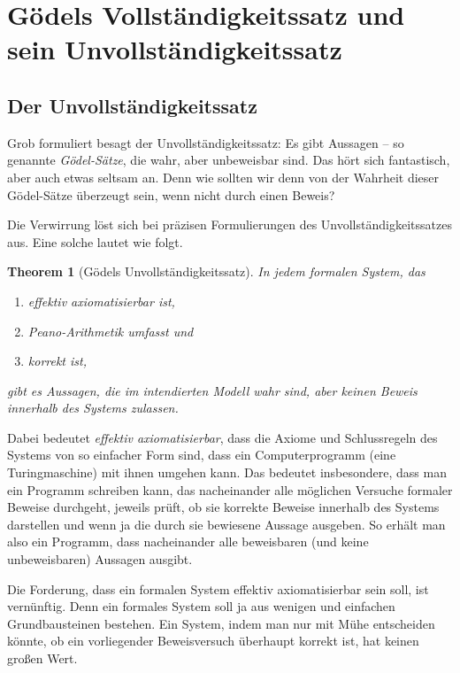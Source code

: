 \documentclass[twoside]{../zirkelblatt1415}
\theoremstyle{definition}
\theoremstyle{plain}
\newtheorem{thm}[defn]{Theorem}
\theoremstyle{remark}
\begin{document}
\section{Gödels Vollständigkeitssatz und sein Unvollständigkeitssatz}

\subsection{Der Unvollständigkeitssatz}

Grob formuliert besagt der Unvollständigkeitssatz: Es gibt Aussagen -- so
genannte \emph{Gödel-Sätze}, die wahr, aber unbeweisbar sind. Das hört sich
fantastisch, aber auch etwas seltsam an. Denn wie sollten wir denn von der
Wahrheit dieser Gödel-Sätze überzeugt sein, wenn nicht durch einen Beweis?

Die Verwirrung löst sich bei präzisen Formulierungen des
Unvollständigkeitssatzes aus. Eine solche lautet wie folgt.

\begin{thm}[Gödels Unvollständigkeitssatz]In jedem formalen System, das
\begin{enumerate}
\item effektiv axiomatisierbar ist,
\item Peano-Arithmetik umfasst und
\item korrekt ist,
\end{enumerate}
gibt es Aussagen, die im intendierten Modell wahr sind, aber keinen Beweis
innerhalb des Systems zulassen.
\end{thm}

Dabei bedeutet \emph{effektiv axiomatisierbar}, dass die Axiome und
Schlussregeln des Systems von so einfacher Form sind, dass ein Computerprogramm
(eine Turingmaschine) mit ihnen umgehen kann. Das bedeutet insbesondere, dass
man ein Programm schreiben kann, das nacheinander alle möglichen Versuche
formaler Beweise durchgeht, jeweils prüft, ob sie korrekte Beweise innerhalb des
Systems darstellen und wenn ja die durch sie bewiesene Aussage ausgeben. So
erhält man also ein Programm, dass nacheinander alle beweisbaren (und keine
unbeweisbaren) Aussagen ausgibt.

Die Forderung, dass ein formalen System effektiv axiomatisierbar sein soll, ist
vernünftig. Denn ein formales System soll ja aus wenigen und einfachen
Grundbausteinen bestehen. Ein System, indem man nur mit Mühe entscheiden
könnte, ob ein vorliegender Beweisversuch überhaupt korrekt ist, hat keinen
großen Wert.
\end{document}
